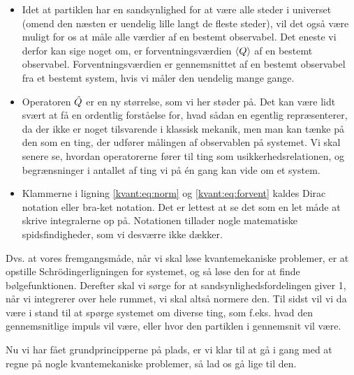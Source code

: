 \documentclass[../Kvantemekanik.tex]{subfiles}
\begin{document}
\begin{itemize}
\item Idet at partiklen har en sandsynlighed for at være alle steder i universet (omend den næsten er uendelig lille langt de fleste steder), vil det også være muligt for os at måle alle værdier af en bestemt observabel. Det eneste vi derfor kan sige noget om, er forventningsværdien $\left< Q \right>$ af en bestemt observabel. Forventningsværdien er gennemsnittet af en bestemt observabel fra et bestemt system, hvis vi måler den uendelig mange gange.

\item Operatoren $\hat Q$ er en ny størrelse, som vi her støder på. Det kan være lidt svært at få en ordentlig forståelse for, hvad sådan en egentlig repræsenterer, da der ikke er noget tilsvarende i klassisk mekanik, men man kan tænke på den som en ting, der udfører målingen af observablen på systemet. Vi skal senere se, hvordan operatorerne fører til ting som usikkerhedsrelationen, og begrænsninger i antallet af ting vi på én gang kan vide om et system.

\item Klammerne i ligning \eqref{kvant:eq:norm} og \eqref{kvant:eq:forvent} kaldes Dirac notation eller bra-ket notation. Det er lettest at se det som en let måde at skrive integralerne op på. Notationen tillader nogle matematiske spidsfindigheder, som vi desværre ikke dækker.

\end{itemize}
Dvs. at vores fremgangsmåde, når vi skal løse kvantemekaniske problemer, er at opstille Schrödingerligningen for systemet, og så løse den for at finde bølgefunktionen. Derefter skal vi sørge for at sandsynlighedsfordelingen giver 1, når vi integrerer over hele rummet, vi skal altså normere den. Til sidst vil vi da være i stand til at spørge systemet om diverse ting, som f.eks. hvad den gennemsnitlige impuls vil være, eller hvor den partiklen i gennemsnit vil være.

Nu vi har fået grundprincipperne på plads, er vi klar til at gå i gang med at regne på nogle kvantemekaniske problemer, så lad os gå lige til den.
\end{document}
